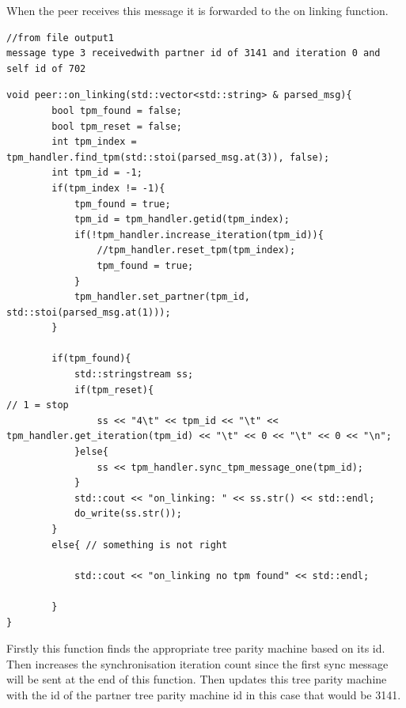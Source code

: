 When the peer receives this message it is forwarded to the on linking function.
\begin{lstlisting}
//from file output1 
message type 3 receivedwith partner id of 3141 and iteration 0 and self id of 702
\end{lstlisting}
\begin{lstlisting}
void peer::on_linking(std::vector<std::string> & parsed_msg){
		bool tpm_found = false;
		bool tpm_reset = false;
		int tpm_index = tpm_handler.find_tpm(std::stoi(parsed_msg.at(3)), false);
		int tpm_id = -1;
		if(tpm_index != -1){
			tpm_found = true;
			tpm_id = tpm_handler.getid(tpm_index);
			if(!tpm_handler.increase_iteration(tpm_id)){
				//tpm_handler.reset_tpm(tpm_index);
				tpm_found = true;	
			}
			tpm_handler.set_partner(tpm_id, std::stoi(parsed_msg.at(1)));
		}     

		if(tpm_found){
			std::stringstream ss;
			if(tpm_reset){                                                                     // 1 = stop 
				ss << "4\t" << tpm_id << "\t" << tpm_handler.get_iteration(tpm_id) << "\t" << 0 << "\t" << 0 << "\n";
			}else{
				ss << tpm_handler.sync_tpm_message_one(tpm_id);
			}
			std::cout << "on_linking: " << ss.str() << std::endl;
			do_write(ss.str());
		}
		else{ // something is not right
			
			std::cout << "on_linking no tpm found" << std::endl;
			
		}
} 
\end{lstlisting}
Firstly this function finds the appropriate tree parity machine based on its id. Then increases the synchronisation iteration count since the first sync message will be sent at the end of this function. Then updates this tree parity machine with the id of the partner tree parity machine id in this case that would be 3141. 

